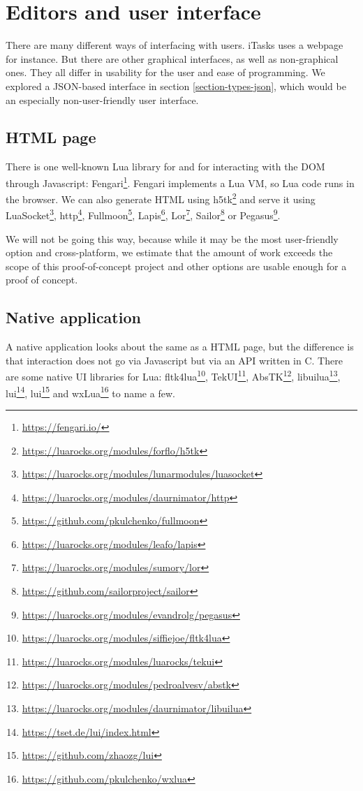 \section{Editors and user interface}\label{section-editors-ui}
There are many different ways of interfacing with users. iTasks uses a webpage for instance. But there are other graphical interfaces, as well as non-graphical ones. They all differ in usability for the user and ease of programming. We explored a JSON-based interface in section \ref{section-types-json}, which would be an especially non-user-friendly user interface.

\subsection{HTML page}
There is one well-known Lua library for and for interacting with the DOM through Javascript: Fengari\footnote{\url{https://fengari.io/}}. Fengari implements a Lua VM, so Lua code runs in the browser. We can also generate HTML using h5tk\footnote{\url{https://luarocks.org/modules/forflo/h5tk}} and serve it using
LuaSocket\footnote{\url{https://luarocks.org/modules/lunarmodules/luasocket}},
http\footnote{\url{https://luarocks.org/modules/daurnimator/http}},
Fullmoon\footnote{\url{https://github.com/pkulchenko/fullmoon}},
Lapis\footnote{\url{https://luarocks.org/modules/leafo/lapis}},
Lor\footnote{\url{https://luarocks.org/modules/sumory/lor}},
Sailor\footnote{\url{https://github.com/sailorproject/sailor}} or
Pegasus\footnote{\url{https://luarocks.org/modules/evandrolg/pegasus}}.

We will not be going this way, because while it may be the most user-friendly option and cross-platform, we estimate that the amount of work exceeds the scope of this proof-of-concept project and other options are usable enough for a proof of concept.

\subsection{Native application}
A native application looks about the same as a HTML page, but the difference is that interaction does not go via Javascript but via an API written in C. There are some native UI libraries for Lua:
fltk4lua\footnote{\url{https://luarocks.org/modules/siffiejoe/fltk4lua}},
TekUI\footnote{\url{https://luarocks.org/modules/luarocks/tekui}},
AbsTK\footnote{\url{https://luarocks.org/modules/pedroalvesv/abstk}\label{footnote-abstk}},
libuilua\footnote{\url{https://luarocks.org/modules/daurnimator/libuilua}},
lui\footnote{\url{https://tset.de/lui/index.html}},
lui\footnote{\url{https://github.com/zhaozg/lui}} and
wxLua\footnote{\url{https://github.com/pkulchenko/wxlua}} to name a few.

